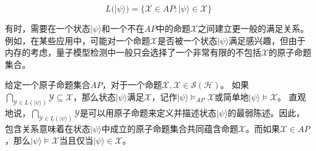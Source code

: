 \begin{equation}
L(|\psi\rangle) = \{\mathcal{X} \in AP : |\psi\rangle \in \mathcal{X}\}
\end{equation}

有时，需要在一个状态$|\psi\rangle$和一个不在$AP$中的命题$\mathcal{X}$之间建立更一般的满足关系。例如，在某些应用中，可能对一个命题$\mathcal{X}$是否被一个状态$|\psi\rangle$满足感兴趣，但由于内存的考虑，量子模型检测中一般只会选择了一个非常有限的不包括$\mathcal{X}$的原子命题集合。

给定一个原子命题集合$AP$，对于一个命题$\mathcal{X},\mathcal{X} \in \mathcal{S}(\mathcal{H})$。
如果$\bigcap_{\mathcal{Y} \in L(|\psi\rangle) }\mathcal{Y} \subseteq \mathcal{X}$，那么状态$|\psi\rangle$满足$\mathcal{X}$，记作$|\psi\rangle \models_{AP} \mathcal{X}$或简单地$|\psi\rangle \models \mathcal{X}$。
直观地说，$\bigcap_{\mathcal{Y} \in L(|\psi\rangle)} \mathcal{Y}$是可以用原子命题来定义并描述状态$|\psi\rangle$的最弱陈述。因此，包含关系意味着在状态$|\psi\rangle$中成立的原子命题集合共同蕴含命题$\mathcal{X}$。而如果$\mathcal{X} \in AP$，那么$|\psi\rangle \models \mathcal{X}$当且仅当$|\psi\rangle \in \mathcal{X}$。

%     

        
            
